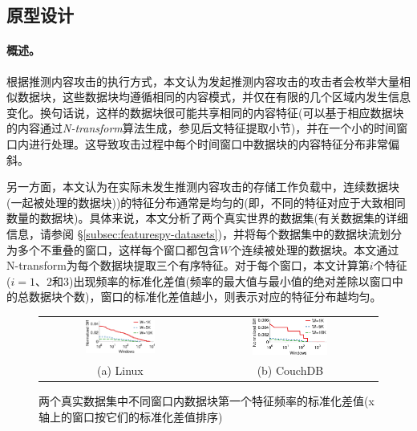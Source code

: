 \subsection{原型设计}
\label{subsec:featurespy-basic}

\paragraph*{概述。}

根据推测内容攻击的执行方式，本文认为发起推测内容攻击的攻击者会枚举大量相似数据块，这些数据块均遵循相同的内容模式，并仅在有限的几个区域内发生信息变化。换句话说，这样的数据块很可能共享相同的内容特征(可以基于相应数据块的内容通过\textit{N-transform}\cite{shilane12}算法生成，参见后文特征提取小节)，并在一个小的时间窗口内进行处理。这导致攻击过程中每个时间窗口中数据块的内容特征分布非常偏斜。

另一方面，本文认为在实际未发生推测内容攻击的存储工作负载中，连续数据块(一起被处理的数据块)\cite{zhu2008avoiding})的特征分布通常是均匀的(即，不同的特征对应于大致相同数量的数据块)。具体来说，本文分析了两个真实世界的数据集(有关数据集的详细信息，请参阅 \S\ref{subsec:featurespy-datasets})，并将每个数据集中的数据块流划分为多个不重叠的窗口，这样每个窗口都包含$W$个连续被处理的数据块。本文通过N-transform\cite{shilane12}为每个数据块提取三个有序特征。对于每个窗口，本文计算第$i$个特征($i=1$、$2$和$3$)出现频率的标准化差值(频率的最大值与最小值的绝对差除以窗口中的总数据块个数)，窗口的标准化差值越小，则表示对应的特征分布越均匀。

\begin{figure}[!htb]
    \centering
    \begin{tabular}{cc}
        \includegraphics[width=0.45\textwidth]{pic/featurespy/plot/featureDistribution/featureDistributionLinux.pdf} &
        \includegraphics[width=0.45\textwidth]{pic/featurespy/plot/featureDistribution/featureDistributionCouchbase.pdf}                    \\
        {\small (a) Linux}                                                                                           & {\small (b) CouchDB} \\
    \end{tabular}
    \caption{两个真实数据集中不同窗口内数据块第一个特征频率的标准化差值(x轴上的窗口按它们的标准化差值排序)}
    \label{fig:featurespy-featureDistribution}
\end{figure}


